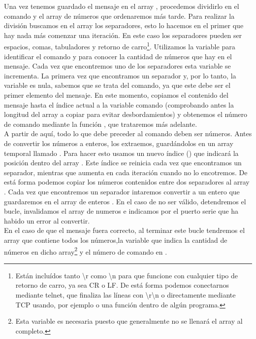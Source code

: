 
Una vez tenemos guardado el mensaje en el array , procedemos dividirlo en el comando y el array de números que ordenaremos más tarde. Para realizar la división buscamos en el array los separadores, esto lo hacemos en el primer  que hay nada más comenzar una iteración. En este caso los separadores pueden ser espacios, comas, tabuladores y retorno de carro\protect\footnote{Están incluídos tanto \textbackslash r como \textbackslash n para que funcione con cualquier tipo de retorno de carro, ya sea CR o LF. De está forma podemos conectarnos mediante telnet, que finaliza las líneas con \textbackslash r\textbackslash n o directamente mediante TCP usando, por ejemplo  o una función dentro de algún programa.}. Utilizamos la variable  para identificar el comando y para conocer la cantidad de números que hay en el mensaje. Cada vez que encontremos uno de los separadores esta variable se incrementa. La primera vez que encontramos un separador y, por lo tanto, la variable  es nula, sabemos que se trata del comando, ya que este debe ser el primer elemento del mensaje. En este momento, copiamos el contenido del mensaje hasta el índice actual a la variable comando (comprobando antes la longitud del array a copiar para evitar desbordamientos) y obtenemos el número de comando mediante la función , que trataremos más adelante.\\
A partir de aquí, todo lo que debe preceder al comando deben ser números. Antes de convertir los números a enteros, los extraemos, guardándolos en un array temporal llamado . Para hacer esto usamos un nuevo índice () que indicará la posición dentro del array . Este índice se reinicia cada vez que encontramos un separador, mientras que aumenta en cada iteración cuando no lo encotremos. De está forma podemos copiar los números contenidos entre dos separadores al array . Cada vez que encontremos un separador intaremos convertir  a un entero que guardaremos en el array de enteros . En el caso de no ser válido, detendremos el bucle, invalidamos el array de numeros e indicamos por el puerto serie que ha habido un error al convertir.\\
En el caso de que el mensaje fuera correcto, al terminar este bucle tendremos el array  que contiene todos los números,la variable  que indica la cantidad de números en dicho array\protect\footnote{Esta variable es necesaria puesto que generalmente no se llenará el array al completo.} y el número de comando en . 

